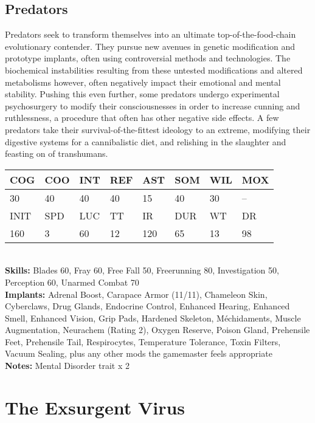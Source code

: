 \subsection{Predators} 

Predators seek to transform themselves into an ultimate top-of-the-food-chain evolutionary contender. They pursue new avenues in genetic modification and prototype implants, often using controversial methods and technologies. The biochemical instabilities resulting from these untested modifications and altered metabolisms however, often negatively impact their emotional and mental stability. Pushing this even further, some predators undergo experimental psychosurgery to modify their consciousnesses in order to increase cunning and ruthlessness, a procedure that often has other negative side effects. A few predators take their survival-of-the-fittest ideology to an extreme, modifying their digestive systems for a cannibalistic diet, and relishing in the slaughter and feasting on of transhumans. 

\begin{tabular}{|l|l|l|l|l|l|l|l|} \hline

COG &COO &INT &REF &AST &SOM &WIL &MOX \\ \hline

30 &40 &40 &40 &15 &40 &30 &-- \\ \hline

INIT &SPD &LUC &TT &IR &DUR &WT &DR \\ \hline

160 &3 &60 &12 &120 &65 &13 &98 \\ \hline

\end{tabular} \\ \textbf{Skills:} Blades 60, Fray 60, Free Fall 50, Freerunning 80, Investigation 50, Perception 60, Unarmed Combat 70 \\ \textbf{Implants:} Adrenal Boost, Carapace Armor (11/11), Chameleon Skin, Cyberclaws, Drug Glands, Endocrine Control, Enhanced Hearing, Enhanced Smell, Enhanced Vision, Grip Pads, Hardened Skeleton, Méchidaments, Muscle Augmentation, Neurachem (Rating 2), Oxygen Reserve, Poison Gland, Prehensile Feet, Prehensile Tail, Respirocytes, Temperature Tolerance, Toxin Filters, Vacuum Sealing, plus any other mods the gamemaster feels appropriate \\ \textbf{Notes:} Mental Disorder trait x 2 

\section{The Exsurgent Virus } 

